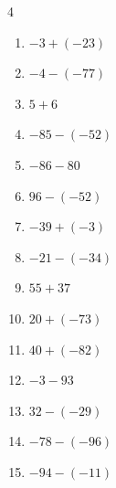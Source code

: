 \begin{multicols}{4}
\begin{enumerate}
        \phantom{$=64$}

  \item $-3+(-23)$

        \phantom{$=-26$}

  \item $-4-(-77)$

        \phantom{$=73$}

  \item $5+6$

        \phantom{$=11$}

  \item $-85-(-52)$

        \phantom{$=-33$}

  \item $-86-80$

        \phantom{$=-166$}

  \item $96-(-52)$

        \phantom{$=148$}

  \item $-39+(-3)$

        \phantom{$=-42$}

  \item $-21-(-34)$

        \phantom{$=13$}

  \item $55+37$

        \phantom{$=92$}

  \item $20+(-73)$

        \phantom{$=-53$}

  \item $40+(-82)$

        \phantom{$=-42$}

  \item $-3-93$

        \phantom{$=-96$}

  \item $32-(-29)$

        \phantom{$=61$}

\columnbreak %

  \item $-78-(-96)$

        \phantom{$=18$}

  \item $-94-(-11)$

        \phantom{$=-83$}


\end{enumerate}
\end{multicols}
